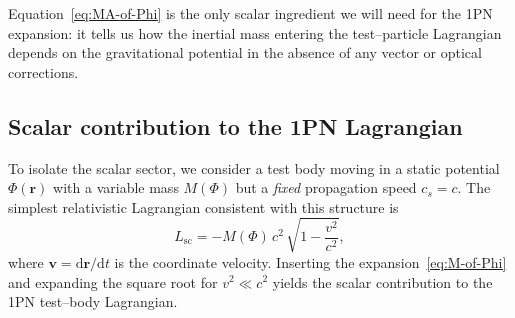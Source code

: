 \documentclass[11pt]{article}
\begin{document}
Equation~\eqref{eq:MA-of-Phi} is the only scalar ingredient we will need for
the 1PN expansion: it tells us how the inertial mass entering the
test--particle Lagrangian depends on the gravitational potential in the
absence of any vector or optical corrections.

\subsection{Scalar contribution to the 1PN Lagrangian}
\label{subsec:scalar-Lagrangian}

To isolate the scalar sector, we consider a test body moving in a static
potential \(\Phi(\mathbf{r})\) with a variable mass \(M(\Phi)\) but a
\emph{fixed} propagation speed \(c_s = c\).  The simplest relativistic
Lagrangian consistent with this structure is
\begin{equation}
  L_{\text{sc}}
  = -M(\Phi)\,c^2\,\sqrt{1 - \frac{v^2}{c^2}},
  \label{eq:L-scalar-rel}
\end{equation}
where \(\mathbf{v} = \mathrm{d}\mathbf{r}/\mathrm{d}t\) is the coordinate
velocity.  Inserting the expansion~\eqref{eq:M-of-Phi} and expanding the
square root for \(v^2 \ll c^2\) yields the scalar contribution to the 1PN
test--body Lagrangian.
\end{document}
